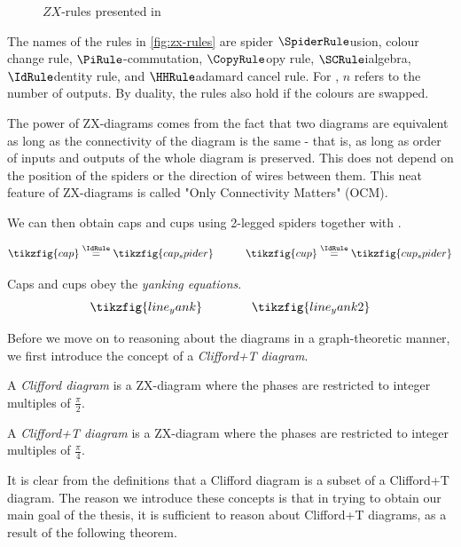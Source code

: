\begin{figure}[h!]
\caption{$ZX$-rules presented in \cite{Kissinger_2019}}\label{table:rewrite}
\label{fig:zx-rules}
\end{figure}

The names of the rules in \autoref{fig:zx-rules} are spider $\SpiderRule$usion, colour change \CCRule rule,
$\PiRule$-commutation, $\CopyRule$opy rule, $\SCRule$ialgebra,
$\IdRule$dentity rule, and $\HHRule$adamard cancel rule.
For \CopyRule, $n$ refers to the number of outputs.
By duality, the rules also hold if the colours are swapped.

The power of ZX-diagrams comes from the fact that two diagrams are equivalent
as long as the connectivity of the diagram is the same -
that is, as long as order of inputs and outputs of the whole diagram is preserved.
This does not depend on the position of the spiders or the direction of wires between them.
This neat feature of ZX-diagrams is called "Only Connectivity Matters" (OCM).

We can then obtain caps and cups using 2-legged spiders together with \IdRule.

\begin{equation}
\tikzfig{cap} \eqrule{\IdRule} \tikzfig{cap_spider} \quad\quad\quad 
\tikzfig{cup} \eqrule{\IdRule} \tikzfig{cup_spider}
\end{equation}

Caps and cups obey the \textit{yanking equations}.
\begin{equation}
\tikzfig{line_yank} \qquad\qquad \tikzfig{line_yank2} 
\end{equation}

Before we move on to reasoning about the diagrams in a graph-theoretic manner,
we first introduce the concept of a \textit{Clifford+T diagram}.

\begin{definition}
  A \textit{Clifford diagram} is a ZX-diagram where the phases are restricted to integer multiples of $\frac{\pi}{2}$.
\end{definition}

\begin{definition}
  A \textit{Clifford+T diagram} is a ZX-diagram where the phases are restricted to integer multiples of $\frac{\pi}{4}$.
\end{definition}

It is clear from the definitions that a Clifford diagram is a subset of a Clifford+T diagram.
The reason we introduce these concepts is that in trying to obtain our main goal of the thesis,
it is sufficient to reason about Clifford+T diagrams, as a result of the following theorem.

